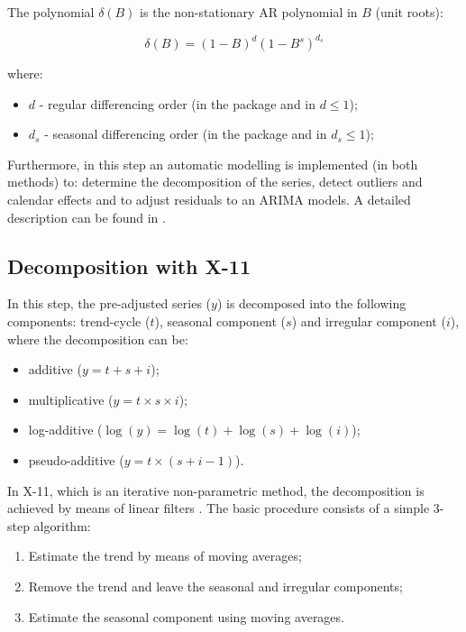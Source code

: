 \documentclass[article]{jss}
\providecommand{\tightlist}{%
  \setlength{\itemsep}{0pt}\setlength{\parskip}{0pt}}
\begin{document}
The polynomial \(\delta(B)\) is the non-stationary AR polynomial in
\(B\) (unit roots):

\[\delta(B)=(1-B)^d(1-B^s)^{d_s}\]

where:

\begin{itemize}
\tightlist
\item
  \(d\) - regular differencing order (in the package and in
   \(d \le 1\));
\item
  \(d_s\) - seasonal differencing order (in the package and in
   \(d_s \le 1\));
\end{itemize}

Furthermore, in this step an automatic modelling is implemented (in both
methods) to: determine the decomposition of the series, detect outliers
and calendar effects and to adjust residuals to an ARIMA models. A
detailed description can be found in \cite{gomez1998automatic}.

\hypertarget{sa-x11}{%
\subsection{Decomposition with X-11}\label{sa-x11}}

In this step, the pre-adjusted series (\(y\)) is decomposed into the
following components: trend-cycle (\(t\)), seasonal component (\(s\))
and irregular component (\(i\)), where the decomposition can be:

\begin{itemize}
\tightlist
\item
  additive (\(y = t + s + i\));\\
\item
  multiplicative (\(y = t \times s \times i\));\\
\item
  log-additive (\(\log(y) = \log(t) + \log(s) + \log(i)\));\\
\item
  pseudo-additive (\(y = t \times (s + i - 1)\)).
\end{itemize}

In X-11, which is an iterative non-parametric method, the decomposition
is achieved by means of linear filters
\citep{findleyx12, ladiray1999x11en}. The basic procedure consists of a
simple 3-step algorithm:

\begin{enumerate}
\def\labelenumi{\arabic{enumi})}
\tightlist
\item
  Estimate the trend by means of moving averages;
\item
  Remove the trend and leave the seasonal and irregular components;
\item
  Estimate the seasonal component using moving averages.
\end{enumerate}
\end{document}
